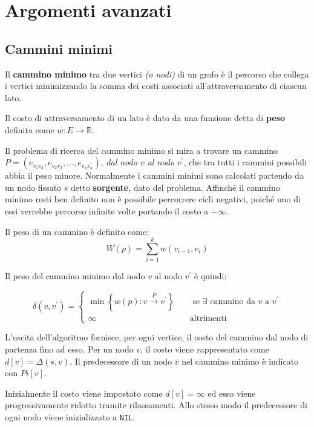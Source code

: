 \documentclass[italian, 10pt]{article}
\begin{document}
\clearpage

\section{Argomenti avanzati}

\subsection{Cammini minimi}

Il \textbf{cammino minimo} tra due vertici \textit{(o nodi)} di un grafo è il percorso che collega i vertici minimizzando la somma dei costi associati all'attraversamento di ciascun lato.

Il costo di attraversamento di un lato è dato da una funzione detta di \textbf{peso} definita come \(w: E \rightarrow \mathbb{R}\).

Il problema di ricerca del cammino minimo si mira a trovare un cammino \(P = (e_{v_1 v_2},e_{v_2 v_3},\ldots, e_{v_n v_n^\prime} )\), \textit{dal nodo \(v\) al nodo \(v^\prime\)}, che tra tutti i cammini possibili abbia il peso minore.
Normalmente i cammini minimi sono calcolati partendo da un nodo fissato \(s\) detto \textbf{sorgente}, dato del problema.
Affinché il cammino minimo resti ben definito non è possibile percorrere cicli negativi, poiché uno di essi verrebbe percorso infinite volte portando il costo a \(-\infty\).

\bigskip
Il peso di un cammino è definito come:
\[ W(p) = \displaystyle \sum_{i=1}^{k} w (v_{i-1}, v_i) \]

Il peso del cammino minimo dal nodo \(v\) al nodo \(v^\prime\) è quindi:

\[ \delta(v, v^\prime) = \begin{cases}
    \min\left\{w(p): v \xrightarrow{P}v^\prime\right\} \quad & \text{ se } \exists \text{ cammino da } v \text{ a } v^\prime \\[10pt]
    \infty                                                   & \text{altrimenti}
  \end{cases}\]

L'uscita dell'algoritmo fornisce, per ogni vertice, il costo del cammino dal nodo di partenza fino ad esso.
Per un nodo \(v\), il costo viene rappresentato come \(d[v] = \Delta(s, v)\).
Il predecessore di un nodo \(v\) nel cammino minimo è indicato con \(Pi[v]\).

Inizialmente il costo viene impostato come \(d[v] = \infty\) ed esso viene progressivamente ridotto tramite rilassamenti.
Allo stesso modo il predecessore di ogni nodo viene inizializzato a \texttt{NIL}.
\end{document}
